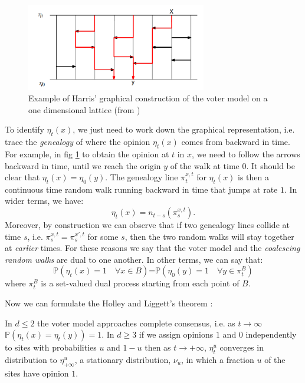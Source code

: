 \begin{figure}

\includegraphics[width=0.7\textwidth]{immagini/harris}\caption{\label{fig:Harris}Example of Harris\textquoteright{} graphical construction
of the voter model on a one dimensional lattice (from \cite{schertzer_brownian_2017}) }

\end{figure}

To identify $\eta_{t}\left(x\right)$, we just need to work down the
graphical representation, i.e. trace the \textit{genealogy} of where
the opinion $\eta_{t}\left(x\right)$ comes from backward in time.
For example, in fig \ref{fig:Harris} to obtain the opinion at $t$
in $x$, we need to follow the arrows backward in time, until we reach
the origin $y$ of the walk at time $0$. It should be clear that
$\eta_{t}\left(x\right)=\eta_{0}\left(y\right)$. The genealogy line
$\pi_{t}^{x,t}$ for $\eta_{t}\left(x\right)$ is then a continuous
time random walk running backward in time that jumps at rate $1$.
In wider terms, we have:
\begin{equation}
\eta_{t}\left(x\right)=n_{t-s}\left(\pi_{s}^{x,t}\right).\label{eq:dual}
\end{equation}
Moreover, by construction we can observe that if two genealogy lines
collide at time $s$, i.e. $\pi_{s}^{x,t}=\pi_{s}^{x',t}$ for some
$s$, then the two random walks will stay together at \textit{earlier}
times. For these reasons we say that the voter model and the \textit{coalescing
random walks} are dual to one another. In other terms, we can say
that:
\begin{equation}
\mathbb{P}\left(\eta_{t}\left(x\right)=1\quad\forall x\in B\right)\text{=}\mathbb{P}\left(\eta_{0}\left(y\right)=1\quad\forall y\in\pi_{t}^{B}\right)\label{eq:dual_P}
\end{equation}
where $\pi_{t}^{B}$ is a set-valued dual process starting from each
point of $B$. 

Now we can formulate the Holley and Liggett's theorem \cite{LiggettH1975}:
\begin{thm}
\label{thm:voter}In $d\leq2$ the voter model approaches complete
consensus, i.e. as $t\to\infty$ $\mathbb{P}\left(\eta_{t}\left(x\right)=\eta_{t}\left(y\right)\right)=1$.
In $d\geq3$ if we assign opinions $1$ and $0$ independently to
sites with probabilities $u$ and $1-u$ then as $t\rightarrow+\infty$,
$\eta_{t}^{u}$ converges in distribution to $\eta_{+\infty}^{u}$,
a stationary distribution, $\nu_{u}$, in which a fraction $u$ of
the sites have opinion $1$. 
\end{thm}


